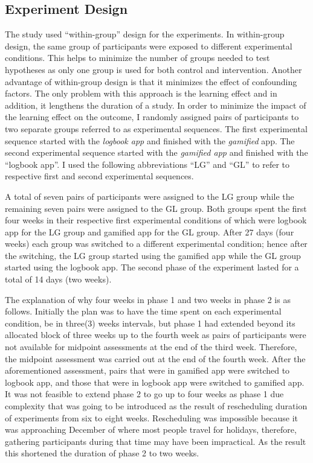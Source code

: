 \subsection{Experiment Design}
The study used ``within-group'' design for the experiments. In within-group design, the same group of participants were exposed to different experimental conditions. This helps to minimize the number of groups needed to test hypotheses as only one group is used for both control and intervention. Another advantage of within-group design is that it minimizes the effect of confounding factors. The only problem with this approach is the learning effect and in addition, it lengthens the duration of a study. In order to minimize the impact of the learning effect on the outcome, I randomly assigned pairs of participants to two separate groups referred to as experimental sequences. The first experimental sequence started with the \emph{logbook app}  and finished with the \emph{gamified} app. The second experimental sequence started with the \emph{gamified app} and finished with the ``logbook app''. I used the following abbreviations ``LG'' and ``GL'' to refer to respective first and second experimental sequences.

A total of seven pairs of participants were assigned to the LG group while the remaining seven pairs were assigned to the GL group. Both groups spent the first four weeks in their respective first experimental conditions of which were logbook app for the LG group and gamified app for the GL group. After 27 days (four weeks) each group was switched to a different experimental condition; hence after the switching, the LG group started using the gamified app while the GL group started using the logbook app. The second phase of the experiment lasted for a total of 14 days (two weeks). 

The explanation of why four weeks in phase 1 and two weeks in phase 2 is as follows. Initially the plan was to have the time spent on each experimental condition, be in three(3) weeks intervals, but phase 1 had extended beyond its allocated block of three weeks up to the fourth week as pairs of participants were not available for midpoint assessments at the end of the third week. Therefore, the midpoint assessment was carried out at the end of the fourth week. After the aforementioned assessment, pairs that were in gamified app were switched to logbook app, and those that were in logbook app were switched to gamified app. It was not feasible to extend phase 2 to go up to four weeks as phase 1 due complexity that was going to be introduced as the result of rescheduling duration of experiments from six to eight weeks. Rescheduling was impossible because it was approaching December of where most people travel for holidays, therefore, gathering participants during that time may have been impractical. As the result this shortened the duration of phase 2 to two weeks. 
